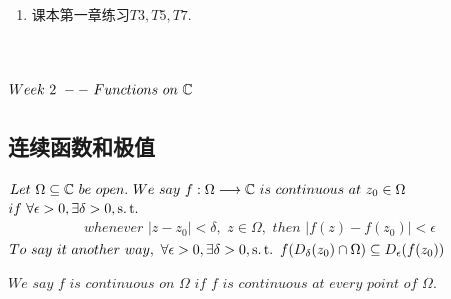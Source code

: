\begin{enumerate}
\begin{proof}
\begin{enumerate}
				\item[$\Leftarrow$]：$Take \,\, a \,\, point \,\, z_n \,\, from \,\, D_{\frac{1}{n}}^{*}(z) \cap \Omega \,\, which \,\, is \,\, not \,\, empty.$\\
				$Then \,\, \{ z_n \} \,\, is \,\, a \,\, Cauchy \,\, sequence \,\, which \,\, converges \,\, to \,\, z.$\\
				$Hence \,\, z \,\, is \,\, a \,\, limit \,\, point \,\, of \,\, \Omega.$
			\end{enumerate}
		\end{proof}
		\begin{rmk}
			$A \,\, limit \,\, point \,\, of \,\, \Omega \,\, may \,\, not \,\, belong \,\, to \,\, \Omega.$
		\end{rmk}
	
		\vspace{2em}
		
		\item 课本第一章练习$T3 , T5 , T7$.
	\end{enumerate}

\chapter{$Week \,\, 2 \,\, -- \,\, Functions \,\, on \,\, \mathbb{C}$}
\section{连续函数和极值}
	\begin{defn}\label{def 2.1.1}
		$Let \,\, \Omega \subseteq \mathbb{C} \,\, be \,\, open. \,\, We \,\, say \,\, f : \Omega \longrightarrow \mathbb{C} \,\, is \,\, continuous \,\, at \,\, z_0 \in \Omega \,\, $\\
		$if \,\, \forall \epsilon > 0 , \exists \delta > 0 , \operatorname{s.t.}$
		\begin{align}
			whenever \,\, \left| z - z_0 \right| < \delta , \,\, z \in \Omega , \,\, then \,\, \left| f(z) - f(z_0) \right| < \epsilon
		\end{align}
		$To \,\, say \,\, it \,\, another \,\, way , \,\, \forall \epsilon > 0 , \exists \delta > 0 , \operatorname{s.t.} \,\, f(D_{\delta}(z_0) \cap \Omega) \subseteq D_{\epsilon}(f(z_0))$
		
		\begin{rmk}
			$We \,\, say \,\, f \,\, is \,\, continuous \,\, on \,\, \Omega \,\, if \,\, f \,\, is \,\, continuous \,\, at \,\, every \,\, point \,\, of \,\, \Omega.$
		\end{rmk}
	\end{defn}
	
